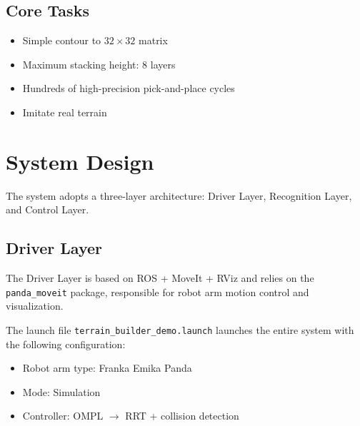 \documentclass[12pt, a4paper]{article}
\begin{document}
\subsection{Core Tasks}

\begin{itemize}
    \item Simple contour to $32 \times 32$ matrix
    \item Maximum stacking height: 8 layers
    \item Hundreds of high-precision pick-and-place cycles
    \item Imitate real terrain
\end{itemize}

\section{System Design}

The system adopts a three-layer architecture: Driver Layer, Recognition Layer, and Control Layer.

\subsection{Driver Layer}

The Driver Layer is based on ROS + MoveIt + RViz and relies on the \texttt{panda\_moveit} package, responsible for robot arm motion control and visualization.

The launch file \texttt{terrain\_builder\_demo.launch} launches the entire system with the following configuration:

\begin{itemize}
    \item Robot arm type: Franka Emika Panda
    \item Mode: Simulation
    \item Controller: OMPL $\to$ RRT + collision detection
\end{itemize}

\end{document}
